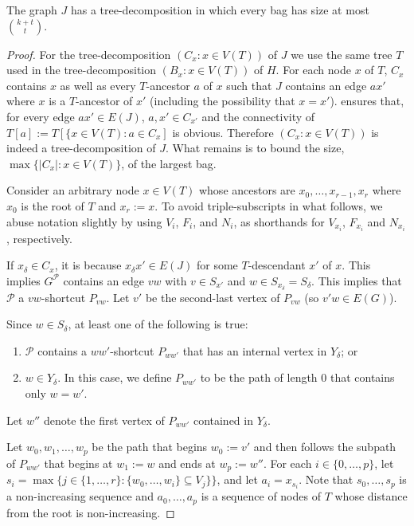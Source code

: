 \documentclass{patmorin}
\begin{document}
\begin{clm}
  The graph $J$ has a tree-decomposition in which every bag has size at most $\binom{k+t}{t}$.
\end{clm}

\begin{proof}
  For the tree-decomposition $(C_x:x\in V(T))$ of $J$ we use the same tree $T$ used in the tree-decomposition $(B_x:x\in V(T))$ of $H$. For each node $x$ of $T$, $C_x$ contains $x$ as well as every $T$-ancestor $a$ of $x$ such that $J$ contains an edge $ax'$ where $x$ is a $T$-ancestor of $x'$ (including the possibility that $x=x'$).
   ensures that, for every edge $ax'\in E(J)$, $a,x'\in C_{x'}$ and the connectivity of $T[a]:=T[\{x\in V(T):a\in C_x]$ is obvious.  Therefore $(C_x:x\in V(T))$ is indeed a tree-decomposition of $J$.  What remains is to bound the size, $\max\{|C_x|:x\in V(T)\}$, of the largest bag.
  
  Consider an arbitrary node $x\in V(T)$ whose ancestors are $x_0,\ldots,x_{r-1},x_r$ where $x_0$ is the root of $T$ and $x_r:=x$.  To avoid triple-subscripts in what follows, we abuse notation slightly by using $V_i$, $F_i$, and $N_i$,  as shorthands for $V_{x_i}$, $F_{x_i}$ and $N_{x_i}$, respectively.   

  If $x_\delta\in C_x$, it is because $x_\delta x'\in E(J)$ for some $T$-descendant $x'$ of $x$.  This implies $G^{\mathcal{P}}$ contains an edge $vw$ with $v\in S_{x'}$ and $w\in S_{x_\delta}=S_\delta$.  This implies that $\mathcal{P}$ a $vw$-shortcut $P_{vw}$.  Let $v'$ be the second-last vertex of $P_{vw}$ (so $v'w\in E(G)$).  
  
  Since $w\in S_{\delta}$, at least one of the following is true:
  \begin{enumerate}
    \item $\mathcal{P}$ contains a $ww'$-shortcut $P_{ww'}$ that has an internal vertex in $Y_{\delta}$; or
    \item $w\in Y_\delta$.  In this case, we define $P_{ww'}$ to be the path of length 0 that contains only $w=w'$. 
  \end{enumerate}
  Let $w''$ denote the first vertex of $P_{ww'}$ contained in $Y_{\delta}$.
  
  Let $w_0,w_1,\ldots,w_p$ be the path that begins $w_0:=v'$ and then follows the subpath of $P_{ww'}$ that begins at $w_1:=w$ and ends at $w_p:=w''$.  For each $i\in\{0,\ldots,p\}$, let $s_i=\max\{j\in\{1,\ldots,r\}: \{w_0,\ldots,w_i\}\subseteq V_{j}\}\}$, and let $a_i=x_{s_i}$.  Note that $s_0,\ldots,s_p$ is a non-increasing sequence and $a_0,\ldots,a_p$ is a sequence of nodes of $T$ whose distance from the root is non-increasing.


\end{proof}
\end{document}
